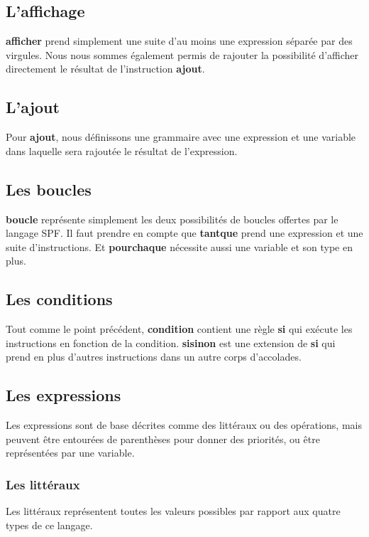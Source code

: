 \subsection{L'affichage}
\textbf{afficher} prend simplement une suite d'au moins une expression séparée par des virgules.
Nous nous sommes également permis de rajouter la possibilité d'afficher directement le résultat de l'instruction \textbf{ajout}. %

\subsection{L'ajout}
Pour \textbf{ajout}, nous définissons une grammaire avec une expression et une variable dans laquelle sera rajoutée le résultat de l'expression.

\subsection{Les boucles}
\textbf{boucle} représente simplement les deux possibilités de boucles offertes par le langage SPF.
Il faut prendre en compte que \textbf{tantque} prend une expression et une suite d'instructions. Et \textbf{pourchaque} nécessite aussi une variable et son type en plus.

\subsection{Les conditions}
Tout comme le point précédent, \textbf{condition} contient une règle \textbf{si} qui exécute les instructions en fonction de la condition.
\textbf{sisinon} est une extension de \textbf{si} qui prend en plus d'autres instructions dans un autre corps d'accolades.

\subsection{Les expressions}
Les expressions sont de base décrites comme des littéraux ou des opérations, mais peuvent être entourées de parenthèses pour donner des priorités, ou être représentées par une variable.

\subsubsection{Les littéraux}
Les littéraux représentent toutes les valeurs possibles par rapport aux quatre types de ce langage.

